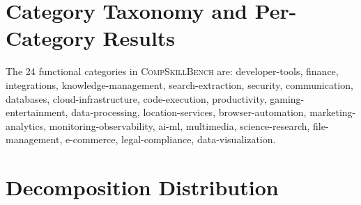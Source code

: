 \documentclass[11pt]{article}
\newcommand{\benchmark}{\textsc{CompSkillBench}}
\begin{document}
\section{Category Taxonomy and Per-Category Results}
\label{app:categories}

The 24 functional categories in \benchmark{} are:
developer-tools, finance, integrations, knowledge-management, search-extraction, security, communication, databases, cloud-infrastructure, code-execution, productivity, gaming-entertainment, data-processing, location-services, browser-automation, marketing-analytics, monitoring-observability, ai-ml, multimedia, science-research, file-management, e-commerce, legal-compliance, data-visualization.

\begin{table}[h]
\centering
\small
\setlength{\tabcolsep}{3pt}
\caption{Per-category SAD improvement (top 11 categories by query count, sorted by $\Delta$DA). SAD improves DA across all categories; the largest gains occur in categories with complex multi-step workflows (marketing, data-processing, cloud).}
\end{table}

\section{Decomposition Distribution}
\label{app:decomp}
\end{document}
